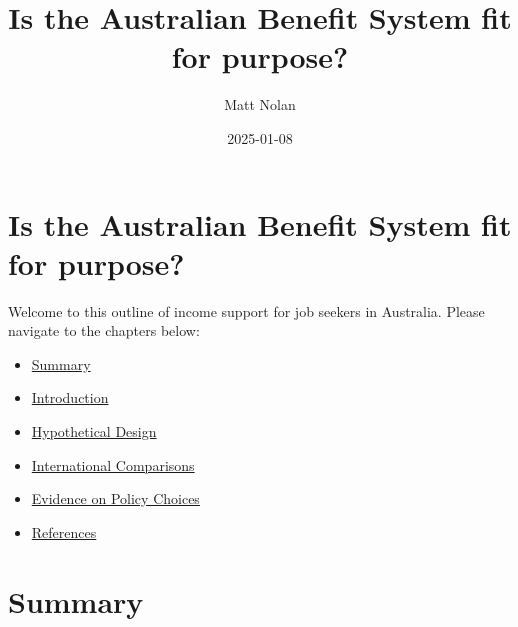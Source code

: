 \documentclass[
  letterpaper,
  DIV=11,
  numbers=noendperiod]{scrreprt}
\title{Is the Australian Benefit System fit for purpose?}
\author{Matt Nolan}
\date{2025-01-08}
\providecommand{\tightlist}{%
  \setlength{\itemsep}{0pt}\setlength{\parskip}{0pt}}\usepackage{longtable,booktabs,array}
\renewcommand*\contentsname{Table of contents}
\newcommand\contentsname{Table of contents}
\begin{document}
\maketitle
\ifdefined\Shaded\renewenvironment{Shaded}{\begin{tcolorbox}[boxrule=0pt, breakable, sharp corners, borderline west={3pt}{0pt}{shadecolor}, enhanced, interior hidden, frame hidden]}{\end{tcolorbox}}\fi

\renewcommand*\contentsname{Table of contents}
{
\hypersetup{linkcolor=}
\setcounter{tocdepth}{2}
\tableofcontents
}

\hypertarget{is-the-australian-benefit-system-fit-for-purpose}{%
\chapter*{Is the Australian Benefit System fit for
purpose?}\label{is-the-australian-benefit-system-fit-for-purpose}}


Welcome to this outline of income support for job seekers in Australia.
Please navigate to the chapters below:

\begin{itemize}
\tightlist
\item
  \protect\hyperlink{summary}{Summary}
\item
  \protect\hyperlink{introduction}{Introduction}
\item
  \protect\hyperlink{hypothetical-design}{Hypothetical Design}
\item
  \protect\hyperlink{international-comparisons}{International
  Comparisons}
\item
  \protect\hyperlink{evidence-on-policy-choices}{Evidence on Policy
  Choices}
\item
  \protect\hyperlink{references}{References}
\end{itemize}


\hypertarget{summary}{%
\chapter{Summary}\label{summary}}

\end{document}
